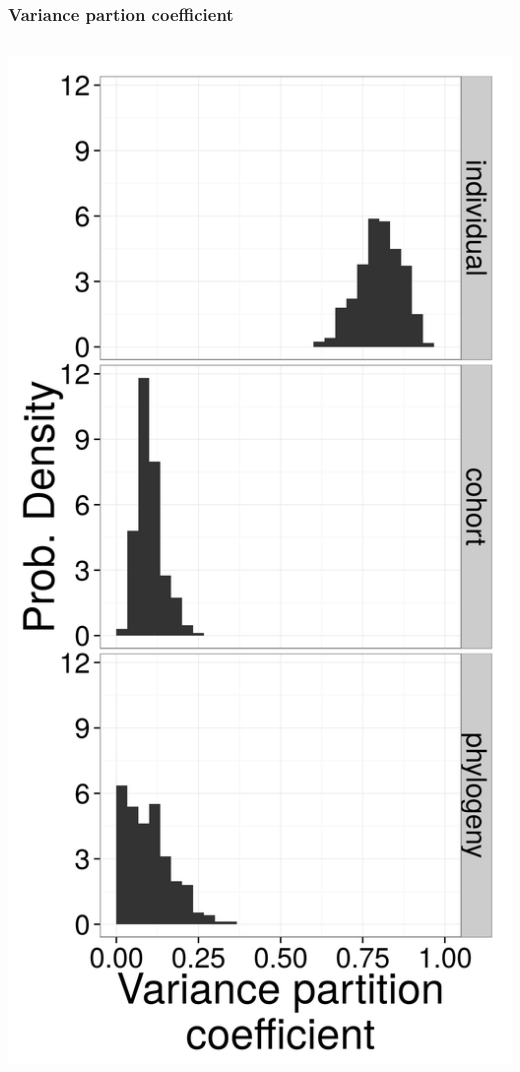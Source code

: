 \documentclass{beamer}
\begin{document}
\begin{frame}
  \frametitle{Variance partion coefficient}
  \begin{columns}
    \begin{column}{0.5\textwidth}
      \begin{center}
        \includegraphics[height = 0.8\textheight, width = \textwidth,  keepaspectratio = true]{figure/variance_est}

\end{center}
\end{column}
\end{columns}
\end{frame}
\end{document}
